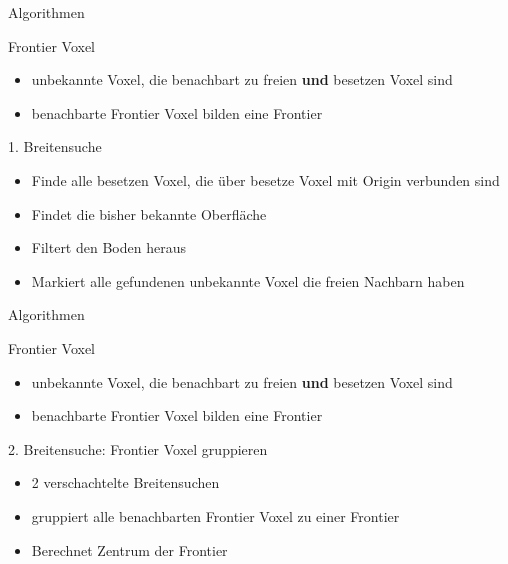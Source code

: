\documentclass{beamer}
\begin{document}
\begin{frame}{Algorithmen}
	\begin{exampleblock}{Frontier Voxel}
		\begin{itemize}
			\item unbekannte Voxel, die benachbart zu freien \textbf{und} besetzen Voxel sind
			\item benachbarte Frontier Voxel bilden eine Frontier
		\end{itemize}
	\end{exampleblock}

	\begin{block}{1. Breitensuche}
		\begin{itemize}
			\item Finde alle besetzen Voxel, die über besetze Voxel mit Origin verbunden sind
			\item Findet die bisher bekannte Oberfläche
			\item Filtert den Boden heraus
			\item Markiert alle gefundenen unbekannte Voxel die freien Nachbarn haben
		\end{itemize}
	\end{block}
\end{frame}

\begin{frame}{Algorithmen}
	\begin{exampleblock}{Frontier Voxel}
		\begin{itemize}
			\item unbekannte Voxel, die benachbart zu freien \textbf{und} besetzen Voxel sind
			\item benachbarte Frontier Voxel bilden eine Frontier
		\end{itemize}
	\end{exampleblock}
	\begin{block}{2. Breitensuche: Frontier Voxel gruppieren}
		\begin{itemize}
			\item 2 verschachtelte Breitensuchen
			\item gruppiert alle benachbarten Frontier Voxel zu einer Frontier
			\item Berechnet Zentrum der Frontier
		\end{itemize}
	\end{block}
\end{frame}
\end{document}
